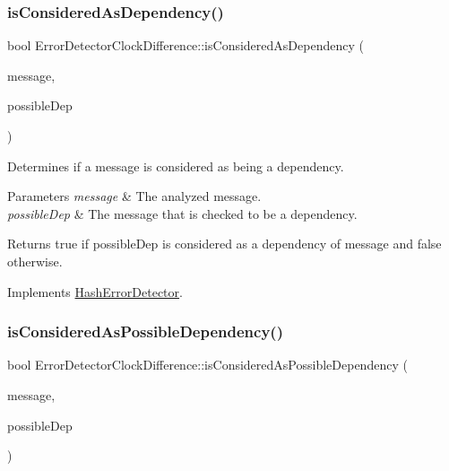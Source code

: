 \subsubsection{\texorpdfstring{is\+Considered\+As\+Dependency()}{isConsideredAsDependency()}}
{\footnotesize\ttfamily bool Error\+Detector\+Clock\+Difference\+::is\+Considered\+As\+Dependency (\begin{DoxyParamCaption}\item[{const \hyperlink{structures_8h_a7e7bdc1d2fff8a9436f2f352b2711ed6}{message\+Info} \&}]{message,  }\item[{const \hyperlink{structures_8h_a7e7bdc1d2fff8a9436f2f352b2711ed6}{message\+Info} \&}]{possible\+Dep }\end{DoxyParamCaption})\hspace{0.3cm}{\ttfamily [virtual]}}



Determines if a message is considered as being a dependency. 


\begin{DoxyParams}{Parameters}
{\em message} & The analyzed message. \\
\hline
{\em possible\+Dep} & The message that is checked to be a dependency. \\
\hline
\end{DoxyParams}
\begin{DoxyReturn}{Returns}
true if possible\+Dep is considered as a dependency of message and false otherwise. 
\end{DoxyReturn}


Implements \hyperlink{class_hash_error_detector_a4693d4d5e327b19f75088cef52bcad7d}{Hash\+Error\+Detector}.

\mbox{\label{class_error_detector_clock_difference_ab20aa1671eb558dea6f06b2440e97e41}} 
\subsubsection{\texorpdfstring{is\+Considered\+As\+Possible\+Dependency()}{isConsideredAsPossibleDependency()}}
{\footnotesize\ttfamily bool Error\+Detector\+Clock\+Difference\+::is\+Considered\+As\+Possible\+Dependency (\begin{DoxyParamCaption}\item[{const \hyperlink{structures_8h_a7e7bdc1d2fff8a9436f2f352b2711ed6}{message\+Info} \&}]{message,  }\item[{const \hyperlink{structures_8h_a7e7bdc1d2fff8a9436f2f352b2711ed6}{message\+Info} \&}]{possible\+Dep }\end{DoxyParamCaption})\hspace{0.3cm}{\ttfamily [virtual]}}



